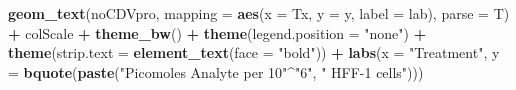 \documentclass[]{article}
\newenvironment{Shaded}{\begin{snugshade}}{\end{snugshade}}
\newcommand{\DataTypeTok}[1]{\textcolor[rgb]{0.13,0.29,0.53}{#1}}
\newcommand{\KeywordTok}[1]{\textcolor[rgb]{0.13,0.29,0.53}{\textbf{#1}}}
\newcommand{\NormalTok}[1]{#1}
\newcommand{\OperatorTok}[1]{\textcolor[rgb]{0.81,0.36,0.00}{\textbf{#1}}}
\newcommand{\StringTok}[1]{\textcolor[rgb]{0.31,0.60,0.02}{#1}}
\begin{document}
\begin{Shaded}
\begin{Highlighting}[]
\StringTok{    }\KeywordTok{geom_text}\NormalTok{(noCDVpro, }\DataTypeTok{mapping =} \KeywordTok{aes}\NormalTok{(}\DataTypeTok{x =}\NormalTok{ Tx, }\DataTypeTok{y =}\NormalTok{ y, }\DataTypeTok{label =}\NormalTok{ lab), }
        \DataTypeTok{parse =}\NormalTok{ T) }\OperatorTok{+}\StringTok{ }\NormalTok{colScale }\OperatorTok{+}\StringTok{ }\KeywordTok{theme_bw}\NormalTok{() }\OperatorTok{+}\StringTok{ }\KeywordTok{theme}\NormalTok{(}\DataTypeTok{legend.position =} \StringTok{"none"}\NormalTok{) }\OperatorTok{+}\StringTok{ }
\StringTok{    }\KeywordTok{theme}\NormalTok{(}\DataTypeTok{strip.text =} \KeywordTok{element_text}\NormalTok{(}\DataTypeTok{face =} \StringTok{"bold"}\NormalTok{)) }\OperatorTok{+}\StringTok{ }\KeywordTok{labs}\NormalTok{(}\DataTypeTok{x =} \StringTok{"Treatment"}\NormalTok{, }
    \DataTypeTok{y =} \KeywordTok{bquote}\NormalTok{(}\KeywordTok{paste}\NormalTok{(}\StringTok{"Picomoles Analyte per 10"}\OperatorTok{^}\StringTok{"6"}\NormalTok{, }\StringTok{" HFF-1 cells"}\NormalTok{)))}
\end{Highlighting}
\end{Shaded}
\end{document}
